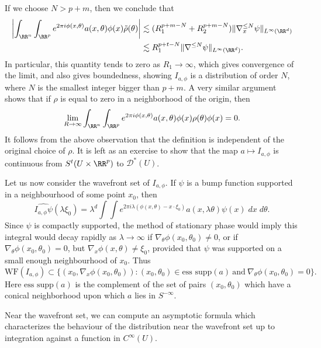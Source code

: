 %
If we choose $N > p + m$, then we conclude that
%
\begin{align*}
    \left| \int_{\RR^n} \int_{\RR^p} e^{2 \pi i \phi(x,\theta)} a(x,\theta) \phi(x) \tilde{\rho}(\theta) \right| &\lesssim (R_1^{p + m - N} + R_2^{p + m - N}) \| \nabla^{\leq N}_x \psi \|_{L^\infty(\RR^d)}\\
    &\lesssim R_1^{p + t - N} \| \nabla^{\leq N} \psi \|_{L^\infty(\RR^d)}.
\end{align*}
%
In particular, this quantity tends to zero as $R_1 \to \infty$, which gives convergence of the limit, and also gives boundedness, showing $I_{a,\phi}$ is a distribution of order $N$, where $N$ is the smallest integer bigger than $p + m$. A very similar argument shows that if $\rho$ is equal to zero in a neighborhood of the origin, then
%
\[ \lim_{R \to \infty} \int_{\RR^n} \int_{\RR^p} e^{2 \pi i \phi(x,\theta)} a(x,\theta) \phi(x) \rho(\theta) \phi(x) = 0. \]
%
It follows from the above observation that the definition is independent of the original choice of $\rho$. It is left as an exercise to show that the map $a \mapsto I_{a,\phi}$ is continuous from $S^t(U \times \RR^p)$ to $\mathcal{D}^*(U)$.

Let us now consider the wavefront set of $I_{a,\phi}$. If $\psi$ is a bump function supported in a neighbourhood of some point $x_0$, then
%
\[ \widehat{I_{a,\phi} \psi}(\lambda \xi_0) = \lambda^d \int \int e^{2 \pi i \lambda (\phi(x,\theta) - x \cdot \xi_0)} a(x,\lambda \theta) \psi(x)\; dx\; d\theta. \]
%
Since $\psi$ is compactly supported, the method of stationary phase would imply this integral would decay rapidly as $\lambda \to \infty$ if $\nabla_\theta \phi(x_0,\theta_0) \neq 0$, or if $\nabla_\theta \phi(x_0,\theta_0) = 0$, but $\nabla_x \phi(x,\theta) \neq \xi_0$, provided that $\psi$ was supported on a small enough neighbourhood of $x_0$. Thus
%
\[ \text{WF}(I_{a,\phi}) \subset \{ (x_0,\nabla_x \phi(x_0,\theta_0)): (x_0,\theta_0) \in \text{ess supp}(a)\ \text{and}\ \nabla_\theta \phi(x_0,\theta_0) = 0 \}. \]
%
Here $\text{ess supp}(a)$ is the complement of the set of pairs $(x_0,\theta_0)$ which have a conical neighborhood upon which $a$ lies in $S^{-\infty}$.

Near the wavefront set, we can compute an asymptotic formula which characterizes the behaviour of the distribution near the wavefront set up to integration against a function in $C^\infty(U)$.

